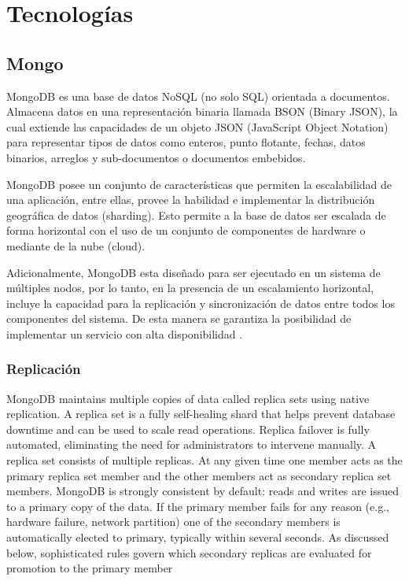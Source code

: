 \section{Tecnologías}

\subsection{Mongo}

MongoDB es una base de datos NoSQL (no solo SQL) orientada a documentos. Almacena
datos en una representación binaria llamada BSON (Binary JSON), la cual extiende
las capacidades de un objeto JSON (JavaScript Object Notation) para representar
tipos de datos como enteros, punto flotante, fechas, datos binarios, arreglos y sub-documentos o
documentos embebidos.

MongoDB posee un conjunto de  características que permiten la escalabilidad de una aplicación, entre ellas,
provee la habilidad e implementar la distribución geográfica de datos (sharding). Esto permite a la
base de datos ser escalada de forma horizontal con el uso de un conjunto de componentes de hardware o mediante
de la nube (cloud).

Adicionalmente, MongoDB esta diseñado para ser ejecutado en un sistema de múltiples nodos, por lo tanto,
en la presencia de un escalamiento horizontal, incluye la capacidad para la replicación
y sincronización de datos entre todos los componentes del sistema. De esta manera se garantiza la posibilidad
de implementar un servicio con alta disponibilidad \cite{10}.

\subsubsection{Replicación}

MongoDB maintains multiple copies of data called replica
sets using native replication. A replica set is a fully
self-healing shard that helps prevent database downtime
and can be used to scale read operations. Replica failover
is fully automated, eliminating the need for administrators
to intervene manually.
A replica set consists of multiple replicas. At any given time
one member acts as the primary replica set member and
the other members act as secondary replica set members.
MongoDB is strongly consistent by default: reads and
writes are issued to a primary copy of the data. If the
primary member fails for any reason (e.g., hardware failure,
network partition) one of the secondary members is
automatically elected to primary, typically within several
seconds. As discussed below, sophisticated rules govern
which secondary replicas are evaluated for promotion to
the primary member


